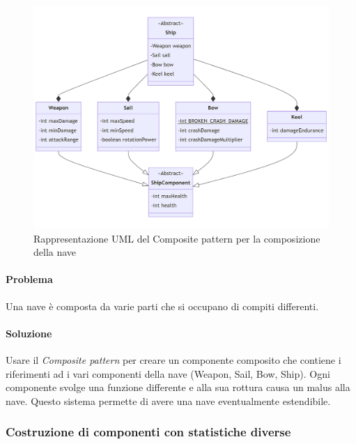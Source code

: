 \documentclass[a4paper,12pt]{report}
\begin{document}
\begin{figure}[H]
	\centering{}
	\includegraphics[width=\textwidth]{img/Ship.png}
	\caption{Rappresentazione UML del Composite pattern per la composizione della nave}
	\label{img:Ship}
\end{figure}

\paragraph{Problema} Una nave è composta da varie parti che si occupano di compiti differenti.
\paragraph{Soluzione} Usare il \textit{Composite pattern} per creare un componente composito che contiene i riferimenti ad i vari componenti della nave (Weapon, Sail, Bow, Ship).
%
Ogni componente svolge una funzione differente e alla sua rottura causa un malus alla nave.
%
Questo sistema permette di avere una nave eventualmente estendibile.
\subsubsection*{Costruzione di componenti con statistiche diverse}
\end{document}
